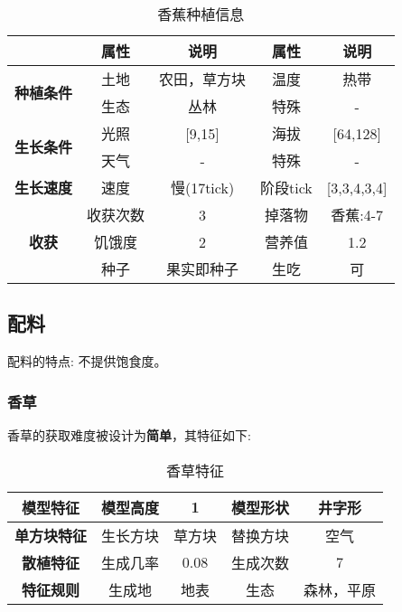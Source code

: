 \begin{table}[H]
    \centering
    \caption{香蕉种植信息}
    \label{table:香蕉种植信息}
    \setlength{\tabcolsep}{4mm}
    \begin{tabular}{c|cc|cc}
        \toprule
                                           & \textbf{属性} & \textbf{说明}    & \textbf{属性} & \textbf{说明}   \\
        \midrule
        \multirow{2}{*}{\textbf{种植条件}} & 土地          & 农田，草方块            & 温度          & 热带      \\
                                           & 生态          & 丛林 & 特殊          & - \\
        \midrule
        \multirow{2}{*}{\textbf{生长条件}} & 光照          & [9,15]          & 海拔          & [64,128]        \\
                                           & 天气          & -               & 特殊          & -              \\
        \midrule
        \textbf{生长速度}                  & 速度          & 慢(17tick)        & 阶段tick      & [3,3,4,3,4]         \\
        \midrule
        \multirow{3}{*}{\textbf{收获}}     & 收获次数      & 3                & 掉落物        & 香蕉:4-7        \\
                                           & 饥饿度        & 2                & 营养值        & 1.2             \\
                                           & 种子 & 果实即种子 & 生吃 & 可 \\
        \bottomrule
    \end{tabular}
\end{table}


\subsection{配料}

配料的特点: 不提供饱食度。

\subsubsection{香草}

香草的获取难度被设计为\textbf{简单}，其特征如下:
\begin{table}[H]
    \centering
    \caption{香草特征}
    \label{table:香草特征}
    \setlength{\tabcolsep}{4mm}
    \begin{tabular}{c|cc|cc}
        \toprule
        \textbf{模型特征}   & 模型高度 & 1      & 模型形状 & 井字形     \\
        \midrule
        \textbf{单方块特征} & 生长方块 & 草方块 & 替换方块 & 空气       \\
        \midrule
        \textbf{散植特征}   & 生成几率 & 0.08    & 生成次数 & 7          \\
        \midrule
        \textbf{特征规则}   & 生成地   & 地表   & 生态     & 森林，平原 \\
        \bottomrule
    \end{tabular}
\end{table}


